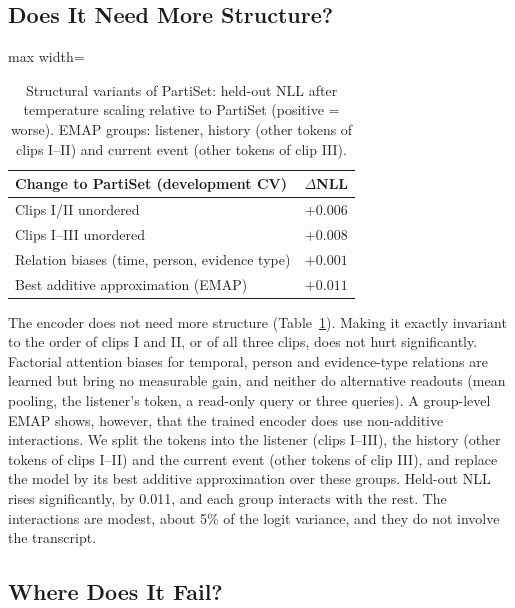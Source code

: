 \documentclass[11pt]{article}
\newcommand{\model}{PartiSet}
\begin{document}
\subsection{Does It Need More Structure?}
\label{sec:structure}

\begin{table}[t]
\centering\small
\begin{adjustbox}{max width=\columnwidth}
\begin{tabular}{lc}
\toprule
Change to \model{} (development CV) & $\Delta$NLL \\
\midrule
Clips I/II unordered & $+0.006$ \\
Clips I--III unordered & $+0.008$ \\
Relation biases (time, person, evidence type) & $+0.001$ \\
Best additive approximation (EMAP) & $+0.011$ \\
\bottomrule
\end{tabular}
\end{adjustbox}
\caption{Structural variants of \model{}: held-out NLL after temperature scaling relative to \model{} (positive =
worse). EMAP groups: listener, history (other tokens of clips I--II) and current event (other tokens of clip III).}
\label{tab:structure}
\end{table}

The encoder does not need more structure (Table~\ref{tab:structure}). Making it exactly invariant to the order of
clips I and II, or of all three clips, does not hurt significantly. Factorial attention biases for temporal, person and
evidence-type relations are learned but bring no measurable gain, and neither do alternative readouts (mean pooling,
the listener's token, a read-only query or three queries). A group-level EMAP \citep{hessel2020emap} shows, however,
that the trained encoder does use non-additive interactions. We split the tokens into the listener (clips I--III), the
history (other tokens of clips I--II) and the current event (other tokens of clip III), and replace the model by its
best additive approximation over these groups. Held-out NLL rises significantly, by 0.011, and each group interacts
with the rest. The interactions are modest, about 5\% of the logit variance, and they do not involve the transcript.

\subsection{Where Does It Fail?}
\label{sec:analysis}
\end{document}
